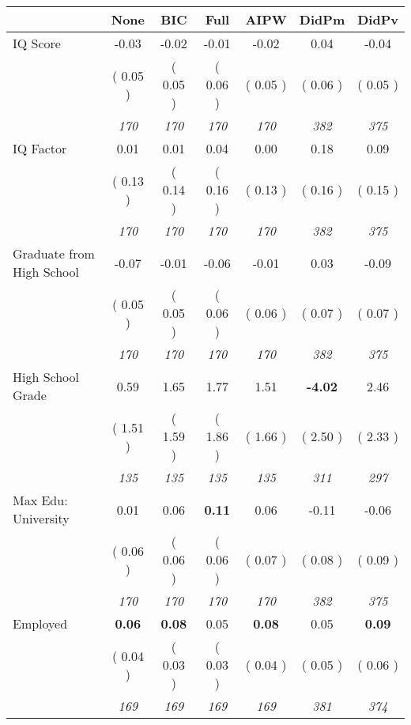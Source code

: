 \begin{tabular}{l c c c c c c}
\toprule
 & None & BIC & Full & AIPW & DidPm & DidPv \\
\midrule
IQ Score &     -0.03 &     -0.02 &     -0.01 &     -0.02 &      0.04 &     -0.04 \\
& (     0.05 ) & (     0.05 ) & (     0.06 ) & (     0.05 ) & (     0.06 ) & (     0.05 ) \\
& \textit{ 170 } & \textit{ 170 } & \textit{ 170 } & \textit{ 170 } & \textit{ 382 } & \textit{ 375 } \\
IQ Factor &      0.01 &      0.01 &      0.04 &      0.00 &      0.18 &      0.09 \\
& (     0.13 ) & (     0.14 ) & (     0.16 ) & (     0.13 ) & (     0.16 ) & (     0.15 ) \\
& \textit{ 170 } & \textit{ 170 } & \textit{ 170 } & \textit{ 170 } & \textit{ 382 } & \textit{ 375 } \\
Graduate from High School &     -0.07 &     -0.01 &     -0.06 &     -0.01 &      0.03 &     -0.09 \\
& (     0.05 ) & (     0.05 ) & (     0.06 ) & (     0.06 ) & (     0.07 ) & (     0.07 ) \\
& \textit{ 170 } & \textit{ 170 } & \textit{ 170 } & \textit{ 170 } & \textit{ 382 } & \textit{ 375 } \\
High School Grade &      0.59 &      1.65 &      1.77 &      1.51 & \textbf{     -4.02 } &      2.46 \\
& (     1.51 ) & (     1.59 ) & (     1.86 ) & (     1.66 ) & (     2.50 ) & (     2.33 ) \\
& \textit{ 135 } & \textit{ 135 } & \textit{ 135 } & \textit{ 135 } & \textit{ 311 } & \textit{ 297 } \\
Max Edu: University &      0.01 &      0.06 & \textbf{      0.11 } &      0.06 &     -0.11 &     -0.06 \\
& (     0.06 ) & (     0.06 ) & (     0.06 ) & (     0.07 ) & (     0.08 ) & (     0.09 ) \\
& \textit{ 170 } & \textit{ 170 } & \textit{ 170 } & \textit{ 170 } & \textit{ 382 } & \textit{ 375 } \\
Employed & \textbf{      0.06 } & \textbf{      0.08 } &      0.05 & \textbf{     0.08} &      0.05 & \textbf{      0.09 } \\
& (     0.04 ) & (     0.03 ) & (     0.03 ) & (     0.04 ) & (     0.05 ) & (     0.06 ) \\
& \textit{ 169 } & \textit{ 169 } & \textit{ 169 } & \textit{ 169 } & \textit{ 381 } & \textit{ 374 } \\

\end{tabular}
